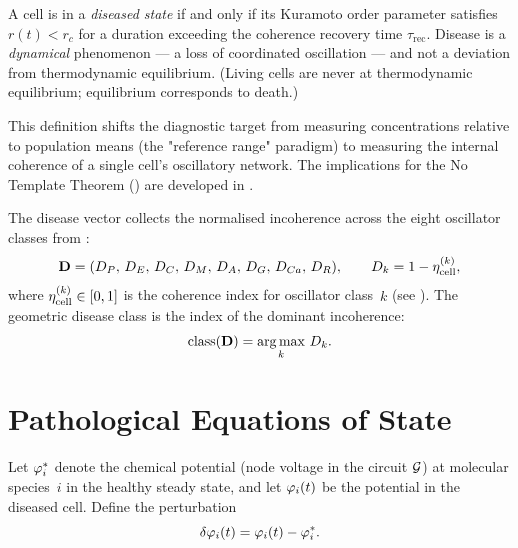 \begin{definition}
\label{def:disease-coherence}
A cell is in a \emph{diseased state} if and only if its Kuramoto order
parameter satisfies $r(t) < r_c$ for a duration exceeding the coherence
recovery time $\tau_{\mathrm{rec}}$.  Disease is a \emph{dynamical} phenomenon
— a loss of coordinated oscillation — and not a deviation from thermodynamic
equilibrium.  (Living cells are never at thermodynamic equilibrium;
equilibrium corresponds to death.)
\end{definition}

\begin{remark}
This definition shifts the diagnostic target from measuring concentrations
relative to population means (the "reference range" paradigm) to measuring
the internal coherence of a single cell's oscillatory network.  The
implications for the No Template Theorem () are
developed in .
\end{remark}

The disease vector collects the normalised incoherence across the eight
oscillator classes from :
\begin{equation}
  \mathbf{D}
  = (D_P,\,D_E,\,D_C,\,D_M,\,D_A,\,D_G,\,D_{Ca},\,D_R),
  \qquad
  D_k = 1 - \eta_{\mathrm{cell}}^{(k)},
  \label{eq:disease-vector}
\end{equation}
where $\eta_{\mathrm{cell}}^{(k)} \in [0,1]$ is the coherence index for oscillator
class~$k$ (see ).  The geometric disease class
is the index of the dominant incoherence:
\begin{equation}
  \mathrm{class}(\mathbf{D}) = \operatorname*{arg\,max}_{k}\, D_k.
  \label{eq:disease-class}
\end{equation}

\section{Pathological Equations of State}
\label{sec:pathological-eqs}

Let $\varphi_i^{*}$ denote the chemical potential (node voltage in the
circuit $\mathcal{G}$) at molecular species~$i$ in the healthy steady state, and
let $\varphi_i(t)$ be the potential in the diseased cell.  Define the
perturbation
\begin{equation}
  \delta\varphi_i(t) = \varphi_i(t) - \varphi_i^{*}.
  \label{eq:potential-perturbation}
\end{equation}

